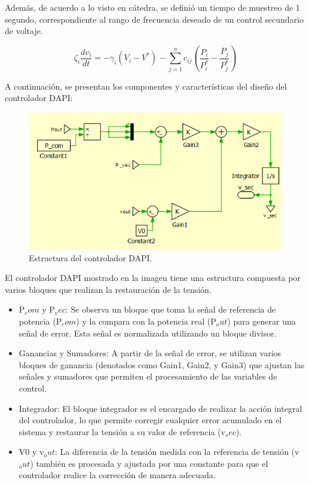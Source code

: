 Además, de acuerdo a lo visto en cátedra, se definió un tiempo de muestreo de 1 segundo, correspondiente al rango de frecuencia deseado de un control secundario de voltaje.

\begin{equation}
    \zeta_i \frac{dv_i}{dt} = -\gamma_i \left( V_i - V^* \right) - \sum_{j=1}^{n} c_{ij} \left( \frac{P_i}{P_i^*} - \frac{P_j}{P_j^*} \right)
    \label{controlador_dapi_tension}
\end{equation}

A continuación, se presentan los componentes y características del diseño del controlador DAPI:

\begin{figure}
    \centering
    \includegraphics[width=1.0\linewidth]{Tarea 2/report/imagenes/p2a/estructura_dapi.png}
    \caption{Estructura del controlador DAPI.}
    \label{estructura_dapi}
\end{figure}

El controlador DAPI mostrado en la imagen tiene una estructura compuesta por varios bloques que realizan la restauración de la tensión.

\begin{itemize}
    \item P$_com$ y P$_vec$: Se observa un bloque que toma la señal de referencia de potencia (P$_com$) y la compara con la potencia real (P$_out$) para generar una señal de error. Esta señal es normalizada utilizando un bloque divisor.
    \item Ganancias y Sumadores: A partir de la señal de error, se utilizan varios bloques de ganancia (denotados como Gain1, Gain2, y Gain3) que ajustan las señales y sumadores que permiten el procesamiento de las variables de control.
    \item Integrador: El bloque integrador es el encargado de realizar la acción integral del controlador, lo que permite corregir cualquier error acumulado en el sistema y restaurar la tensión a su valor de referencia (v$_sec$).
    \item V0 y v$_out$: La diferencia de la tensión medida con la referencia de tensión (v$_out$) también es procesada y ajustada por una constante para que el controlador realice la corrección de manera adecuada.
\end{itemize}

